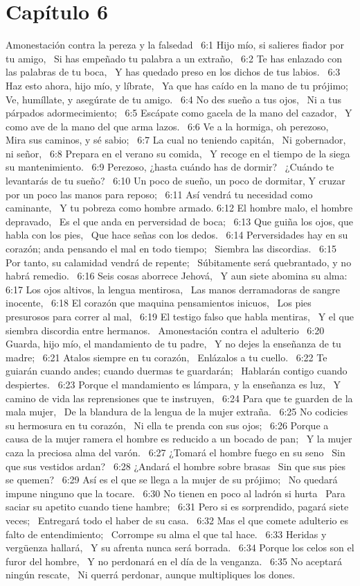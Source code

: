 \section*{Capítulo 6 }
Amonestación contra la pereza y la falsedad  
6:1 Hijo mío, si salieres fiador por tu amigo,  
Si has empeñado tu palabra a un extraño,  
6:2 Te has enlazado con las palabras de tu boca,  
Y has quedado preso en los dichos de tus labios.  
6:3 Haz esto ahora, hijo mío, y líbrate,  
Ya que has caído en la mano de tu prójimo;  
Ve, humíllate, y asegúrate de tu amigo.  
6:4 No des sueño a tus ojos,  
Ni a tus párpados adormecimiento;  
6:5 Escápate como gacela de la mano del cazador,  
Y como ave de la mano del que arma lazos.  
6:6 Ve a la hormiga, oh perezoso,  
Mira sus caminos, y sé sabio;  
6:7 La cual no teniendo capitán,  
Ni gobernador, ni señor,  
6:8 Prepara en el verano su comida,  
Y recoge en el tiempo de la siega su mantenimiento.  
6:9 Perezoso, ¿hasta cuándo has de dormir?  
¿Cuándo te levantarás de tu sueño?  
6:10 Un poco de sueño, un poco de dormitar, 
Y cruzar por un poco las manos para reposo;  
6:11 Así vendrá tu necesidad como caminante,  
Y tu pobreza como hombre armado. 
6:12 El hombre malo, el hombre depravado,  
Es el que anda en perversidad de boca;  
6:13 Que guiña los ojos, que habla con los pies,  
Que hace señas con los dedos.  
6:14 Perversidades hay en su corazón; anda pensando el mal en todo tiempo;  
Siembra las discordias.  
6:15 Por tanto, su calamidad vendrá de repente;  
Súbitamente será quebrantado, y no habrá remedio.  
6:16 Seis cosas aborrece Jehová,  
Y aun siete abomina su alma:  
6:17 Los ojos altivos, la lengua mentirosa,  
Las manos derramadoras de sangre inocente,  
6:18 El corazón que maquina pensamientos inicuos,  
Los pies presurosos para correr al mal,  
6:19 El testigo falso que habla mentiras,  
Y el que siembra discordia entre hermanos.  
Amonestación contra el adulterio  
6:20 Guarda, hijo mío, el mandamiento de tu padre,  
Y no dejes la enseñanza de tu madre;  
6:21 Atalos siempre en tu corazón,  
Enlázalos a tu cuello.  
6:22 Te guiarán cuando andes; cuando duermas te guardarán;  
Hablarán contigo cuando despiertes.  
6:23 Porque el mandamiento es lámpara, y la enseñanza es luz,  
Y camino de vida las reprensiones que te instruyen,  
6:24 Para que te guarden de la mala mujer,  
De la blandura de la lengua de la mujer extraña.  
6:25 No codicies su hermosura en tu corazón,  
Ni ella te prenda con sus ojos;  
6:26 Porque a causa de la mujer ramera el hombre es reducido a un bocado de pan;  
Y la mujer caza la preciosa alma del varón.  
6:27 ¿Tomará el hombre fuego en su seno  
Sin que sus vestidos ardan?  
6:28 ¿Andará el hombre sobre brasas  
Sin que sus pies se quemen?  
6:29 Así es el que se llega a la mujer de su prójimo;  
No quedará impune ninguno que la tocare.  
6:30 No tienen en poco al ladrón si hurta  
Para saciar su apetito cuando tiene hambre;  
6:31 Pero si es sorprendido, pagará siete veces;  
Entregará todo el haber de su casa.  
6:32 Mas el que comete adulterio es falto de entendimiento;  
Corrompe su alma el que tal hace.  
6:33 Heridas y vergüenza hallará,  
Y su afrenta nunca será borrada.  
6:34 Porque los celos son el furor del hombre,  
Y no perdonará en el día de la venganza.  
6:35 No aceptará ningún rescate,  
Ni querrá perdonar, aunque multipliques los dones.  
